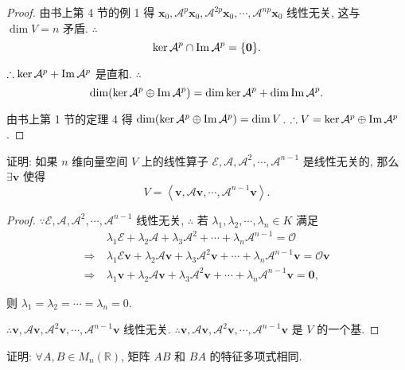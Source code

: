 \documentclass{ctexart}
\begin{document}
\begin{proof}
    由书上第 4 节的例 1 得 $\boldsymbol{x}_0,\mathcal{A}^p\boldsymbol{x}_0,\mathcal{A}^{2p}\boldsymbol{x}_0,\cdots,\mathcal{A}^{np}\boldsymbol{x}_0$ 线性无关, 这与 $\dim V=n$ 矛盾. $\therefore$
    \[\ker\mathcal{A}^p\cap\operatorname{Im} \mathcal{A}^p=\{\boldsymbol{0}\}.\]

    $\therefore\ker\mathcal{A}^p+\operatorname{Im} \mathcal{A}^p$ 是直和. $\therefore$
    \[\dim(\ker\mathcal{A}^p\oplus\operatorname{Im} \mathcal{A}^p)=\dim\ker\mathcal{A}^p+\dim\operatorname{Im} \mathcal{A}^p.\]

    由书上第 1 节的定理 4 得 $\dim(\ker\mathcal{A}^p\oplus\operatorname{Im} \mathcal{A}^p)=\dim V$. $\therefore V=\ker\mathcal{A}^p\oplus\operatorname{Im} \mathcal{A}^p$.
\end{proof}
\begin{exercise}%
    证明: 如果 $n$ 维向量空间 $V$ 上的线性算子 $\mathcal{E},\mathcal{A},\mathcal{A}^2,\cdots,\mathcal{A}^{n-1}$ 是线性无关的, 那么 $\exists\boldsymbol{v}$ 使得
    \[V=\left<\boldsymbol{v},\mathcal{A}\boldsymbol{v},\cdots,\mathcal{A}^{n-1}\boldsymbol{v}\right>.\]
\end{exercise}
\begin{proof}
    $\because\mathcal{E},\mathcal{A},\mathcal{A}^2,\cdots,\mathcal{A}^{n-1}$ 线性无关, $\therefore$ 若 $\lambda_1,\lambda_2,\cdots,\lambda_n\in K$ 满足
    \begin{align*}
        & \lambda_1\mathcal{E}+\lambda_2\mathcal{A}+\lambda_3\mathcal{A}^2+\cdots+\lambda_n\mathcal{A}^{n-1}=\mathcal{O} \\
        \Rightarrow\ & \lambda_1\mathcal{E}\boldsymbol{v}+\lambda_2\mathcal{A}\boldsymbol{v}+\lambda_3\mathcal{A}^2\boldsymbol{v}+\cdots+\lambda_n\mathcal{A}^{n-1}\boldsymbol{v}=\mathcal{O}\boldsymbol{v} \\
        \Rightarrow\ & \lambda_1\boldsymbol{v}+\lambda_2\mathcal{A}\boldsymbol{v}+\lambda_3\mathcal{A}^2\boldsymbol{v}+\cdots+\lambda_n\mathcal{A}^{n-1}\boldsymbol{v}=\boldsymbol{0},
    \end{align*}

    则 $\lambda_1=\lambda_2=\cdots=\lambda_n=0$.

    $\therefore\boldsymbol{v},\mathcal{A}\boldsymbol{v},\mathcal{A}^2\boldsymbol{v},\cdots,\mathcal{A}^{n-1}\boldsymbol{v}$ 线性无关. $\therefore\boldsymbol{v},\mathcal{A}\boldsymbol{v},\mathcal{A}^2\boldsymbol{v},\cdots,\mathcal{A}^{n-1}\boldsymbol{v}$ 是 $V$ 的一个基.
\end{proof}
\begin{exercise}%
    证明: $\forall A,B\in M_n(\mathbb{R})$, 矩阵 $AB$ 和 $BA$ 的特征多项式相同.
\end{exercise}
\end{document}
